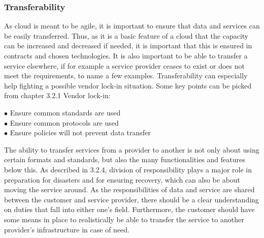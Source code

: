 \documentclass{article}
\begin{document}
\subsubsection{Transferability}
As cloud is meant to be agile, it is important to ensure that data and services can be easily transferred. Thus, as it is a basic feature of a cloud that the capacity can be increased and decreased if needed, it is important that this is ensured in contracts and chosen technologies. It is also important to be able to transfer a service elsewhere, if for example a service provider ceases to exist or does not meet the requirements, to name a few examples. Transferability can especially help fighting a possible vendor lock-in situation. Some key points can be picked from chapter 3.2.1 Vendor lock-in:
\begin{description}
	\item[$\bullet$ Ensure common standards are used]
	\item[$\bullet$ Ensure common protocols are used]
	\item[$\bullet$ Ensure policies will not prevent data transfer]
\end{description}

\par
The ability to transfer services from a provider to another is not only about using certain formats and standards, but also the many functionalities and features below this. As described in 3.2.4, division of responsibility plays a major role in preparation for disasters and for ensuring recovery, which can also be about moving the service around. As the responsibilities of data and service are shared between the customer and service provider, there should be a clear understanding on duties that fall into either one's field. Furthermore, the customer should have some means in place to realistically be able to transfer the service to another provider's infrastructure in case of need.
\end{document}
